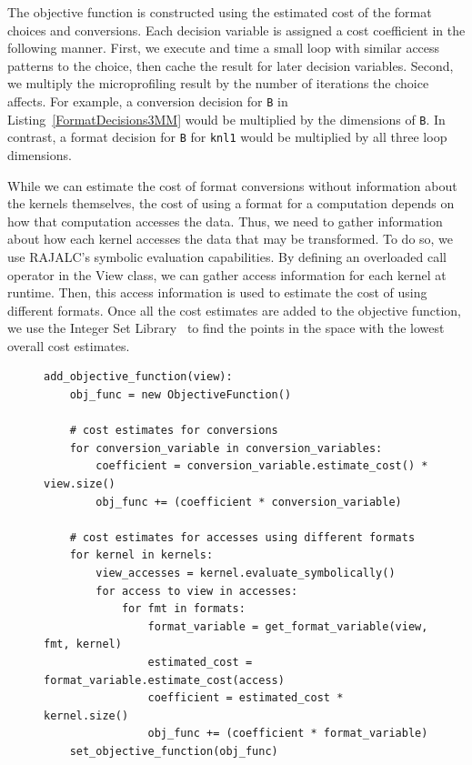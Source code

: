 \documentclass[sigconf]{acmart}
\begin{document}
The objective function is constructed using the estimated cost of the format choices and conversions. 
Each decision variable is assigned a cost coefficient in the following manner.
First, we execute and time a small loop with similar access patterns to the choice, then cache the result for later decision variables.
Second, we multiply the microprofiling result by the number of iterations the choice affects.
For example, a conversion decision for \verb.B. in Listing~\ref{FormatDecisions3MM} would be multiplied by the dimensions of \verb.B..
In contrast, a format decision for \verb.B. for \verb.knl1. would be multiplied by all three loop dimensions. 

While we can estimate the cost of format conversions without information about the kernels themselves, the cost of using a format for a computation depends on how that computation accesses the data.
Thus, we need to gather information about how each kernel accesses the data that may be transformed. 
To do so, we use RAJALC's symbolic evaluation capabilities. 
By defining an overloaded call operator in the View class, we can gather access information for each kernel at runtime. 
Then, this access information is used to estimate the cost of using different formats. 
Once all the cost estimates are added to the objective function, we use the Integer Set Library~\cite{verdoolaege2010isl} to find the points in the space with the lowest overall cost estimates. 



\begin{figure}
\begin{lstlisting}[caption={Algorithm for constructing objective function.}, label={AlgObjFunc}]
add_objective_function(view):
	obj_func = new ObjectiveFunction()
	
	# cost estimates for conversions
	for conversion_variable in conversion_variables:
		coefficient = conversion_variable.estimate_cost() * view.size()
		obj_func += (coefficient * conversion_variable)
	
	# cost estimates for accesses using different formats
	for kernel in kernels:
		view_accesses = kernel.evaluate_symbolically()
		for access to view in accesses:
			for fmt in formats:
				format_variable = get_format_variable(view, fmt, kernel)
				estimated_cost = format_variable.estimate_cost(access)
				coefficient = estimated_cost * kernel.size()
				obj_func += (coefficient * format_variable)
	set_objective_function(obj_func)
\end{lstlisting}
\end{figure}
\end{document}
